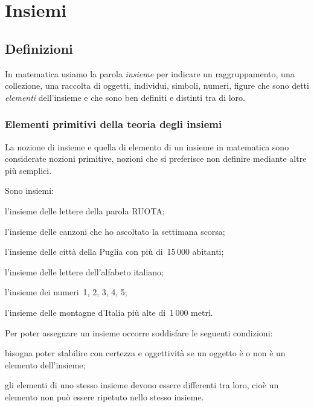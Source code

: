 
\chapter{Insiemi}

\section{Definizioni}
\label{sec:insiemi_definizioni}

In matematica usiamo la parola \textit{insieme} per indicare un
raggruppamento, una collezione, una raccolta di oggetti, individui,
simboli, numeri, figure che sono detti \textit{elementi}
dell'insieme e che sono ben definiti e distinti tra di
loro.

\subsection{Elementi primitivi della teoria degli insiemi}
\label{subsec:el_prim}

La nozione di insieme e quella di elemento di un insieme in matematica
sono considerate nozioni primitive, nozioni che si preferisce non
definire mediante altre più semplici.

\begin{exrig}
 \begin{esempio}
 Sono insiemi:
 \begin{enumeratea}
  \item l'insieme delle lettere della parola RUOTA;
  \item l'insieme delle canzoni che ho ascoltato la settimana scorsa;
  \item l'insieme delle città della Puglia con più di~15\,000 abitanti;
  \item l'insieme delle lettere dell'alfabeto italiano;
  \item l'insieme dei numeri~1, 2, 3, 4, 5;
  \item l'insieme delle montagne d'Italia più alte di~1\,000 metri.
 \end{enumeratea}
 \end{esempio}
\end{exrig}

Per poter assegnare un insieme occorre soddisfare le seguenti condizioni:

\begin{itemize*}
\item bisogna poter stabilire con certezza e oggettività se un oggetto
è o non è un elemento dell'insieme;
\item gli elementi di uno stesso insieme devono essere differenti tra
loro, cioè un elemento non può essere ripetuto nello stesso insieme.
\end{itemize*}

